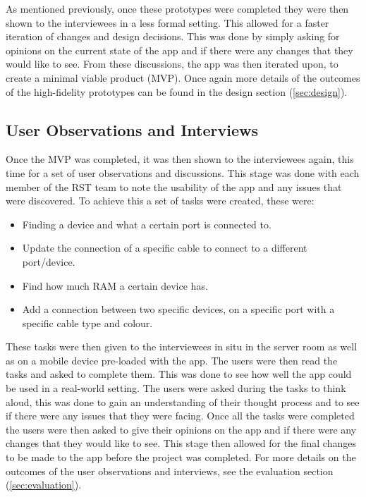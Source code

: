 \documentclass [11pt,a4paper]{article}
\begin{document}
As mentioned previously, once these prototypes were completed they were then shown to the interviewees in a less formal setting. This allowed for a faster iteration of changes and design decisions. This was done by simply asking for opinions on the current state of the app and if there were any changes that they would like to see. From these discussions, the app was then iterated upon, to create a minimal viable product (MVP). Once again more details of the outcomes of the high-fidelity prototypes can be found in the design section (\ref{sec:design}).

\subsection{User Observations and Interviews}
\label{sec:user_observations_and_interviews}
Once the MVP was completed, it was then shown to the interviewees again, this time for a set of user observations and discussions. This stage was done with each member of the RST team to note the usability of the app and any issues that were discovered. To achieve this a set of tasks were created, these were:
\begin{itemize}
    \item Finding a device and what a certain port is connected to.
    \item Update the connection of a specific cable to connect to a different port/device.
    \item Find how much RAM a certain device has.
    \item Add a connection between two specific devices, on a specific port with a specific cable type and colour.
\end{itemize}

These tasks were then given to the interviewees in situ in the server room as well as on a mobile device pre-loaded with the app. The users were then read the tasks and asked to complete them. This was done to see how well the app could be used in a real-world setting. The users were asked during the tasks to think aloud, this was done to gain an understanding of their thought process and to see if there were any issues that they were facing. Once all the tasks were completed the users were then asked to give their opinions on the app and if there were any changes that they would like to see. This stage then allowed for the final changes to be made to the app before the project was completed. For more details on the outcomes of the user observations and interviews, see the evaluation section (\ref{sec:evaluation}).
\end{document}

